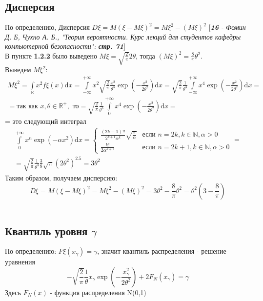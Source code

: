 \documentclass[14pt,a4paper,oneside]{extbook}
\begin{document}
	\subsection{Дисперсия}
	По определению, Дисперсия $D\xi = M(\xi - M\xi)^2 = M\xi^2 - (M\xi)^2$ [\textit{\textbf{16} - Фомин Д. Б, Чухно А. Б., "Теория вероятности. Курс лекций для студентов кафедры компьютерной безопасности": \textbf{стр. 71}}] \\
	В пункте \textbf{1.2.2} было выведено $M\xi = \displaystyle\sqrt{\frac{2}{\pi}} 2\theta$, тогда $(M\xi)^2 = \displaystyle \frac{8}{\pi} \theta^2$.\\
    Выведем $M\xi^2$:
    \begin{multline*}
    M\xi^2 = \int\limits_\mathbb{R} x^2 f\xi(x)\mathrm{d}x = \int\limits_{-\infty}^{+\infty}x^2 \sqrt{\frac{2}{\pi}} \frac{x^2}{\theta^3}\exp(-\frac{x^2}{2\theta^2})\mathrm{d}x = \sqrt{\frac{2}{\pi}} \frac{1}{\theta^3} \int\limits_{-\infty}^{+\infty} x^4\exp(-\frac{x^2}{2\theta^2})\mathrm{d}x =\\=\textrm{так как }x,\theta \in \mathbb{R}^+, \textrm{ то} = \sqrt{\frac{2}{\pi}} \frac{1}{\theta^3} \int\limits_{0}^{+\infty} x^4\exp(-\frac{x^2}{2\theta^2})\mathrm{d}x =\end{multline*}
    = это следующий интеграл
    \begin{multline*}
     \int\limits_{0}^{+\infty} x^n\exp(-\alpha x^2)\mathrm{d}x = 
    \begin{cases}
    \displaystyle\frac{(2k-1)!!}{2^{k+1}\alpha^k}\sqrt{\frac{\pi}{\alpha}} & \textrm{если } n = 2k, k \in \mathbb{N} , \alpha > 0\\
    \displaystyle\frac{k!}{2\alpha^{k+1}}  & \textrm{если } n = 2k+1, k \in \mathbb{N} , \alpha > 0 
    \end{cases}
      =\\=  \sqrt{\frac{2}{\pi}} \frac{1}{\theta^3} \frac{3}{8} \sqrt{\pi} (2\theta^2)^{2.5}  = 3\theta^2
    \end{multline*}
    Таким образом, получаем дисперсию:
    $$D\xi = M(\xi-M\xi)^2 = M\xi^2 - (M\xi)^2 = 3\theta^2 - \displaystyle \frac{8}{\pi} \theta^2 = \theta^2 (3 - \displaystyle\frac{8}{\pi})$$\\
    
	\subsection{Квантиль уровня $\gamma$}
	По определению: $F\xi(x_\gamma) = \gamma$, значит квантиль распределения - решение уравнения 
    $$\displaystyle -\sqrt{\frac{2}{\pi}}\frac{1}{\theta}x_\gamma \exp(-\frac{x_\gamma^2}{2\theta^2}) + 2 F_N(x_\gamma) = \gamma$$
    Здесь $F_N(x)$ - функция распределения N(0,1)\\
    
\end{document}
